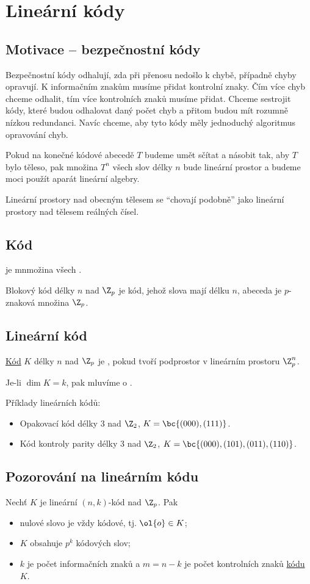 \section{Lineární kódy}
\subsection{Motivace -- bezpečnostní kódy}
Bezpečnostní kódy odhalují, zda při přenosu nedošlo k chybě, případně chyby opravují. K informačním znakům musíme přidat kontrolní znaky. Čím více chyb chceme odhalit, tím více kontrolních znaků musíme přidat. Chceme sestrojit kódy, které budou odhalovat daný počet chyb a přitom budou mít rozumně nízkou redundanci. Navíc chceme, aby tyto kódy měly jednoduchý algoritmus opravování chyb.

Pokud na konečné kódové abecedě $T$ budeme umět sčítat a násobit tak, aby $T$ bylo těleso, pak množina $T^n$ všech slov délky $n$ bude lineární prostor a budeme moci použít aparát lineární algebry.

Lineární prostory nad obecným tělesem se \enquote{chovají podobně} jako lineární prostory nad tělesem reálných čísel.

\subsection{Kód}\label{kod}
 je mnmožina všech .

Blokový kód délky $n$ nad $\Z_p$ je kód, jehož slova mají délku $n$, abeceda je $p$-znaková množina $\Z_p$.

\subsection{Lineární kód}\label{linKod}
\hyperref[kod]{Kód} $K$ délky $n$ nad $\Z_p$ je , pokud tvoří podprostor v lineárním prostoru $\Z_p^n$.

Je-li $\dim K = k$, pak mluvíme o .

Příklady lineárních kódů:
\vspace{-1em}
\begin{itemize}
	\item Opakovací kód délky 3 nad $\Z_2$, $K = \bc{(000), (111)}$.
	\item Kód kontroly parity délky 3 nad $\Z_2$, $K = \bc{(000), (101), (011), (110)}$.
\end{itemize}

\subsection{Pozorování na lineárním kódu}
Nechť $K$ je lineární $(n,k)$-kód nad $\Z_p$. Pak
\vspace{-1em}
\begin{itemize}
	\item nulové slovo je vždy kódové, tj. $\ol{o} \in K$;
	\item $K$ obsahuje $p^k$ kódových slov;
	\item $k$ je počet informačních znaků a $m = n-k$ je počet kontrolních znaků \hyperref[kod]{kódu} $K$.
\end{itemize}

